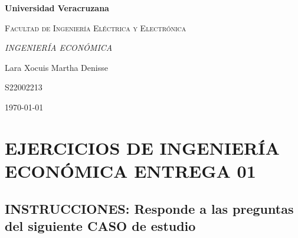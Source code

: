 \documentclass[letterpaper,12pt]{article}
\begin{document}
\thispagestyle{empty}
\newpage
\setcounter{page}{1}
\pagestyle{headings}
\begin{sloppypar} 
    \begin{titlepage}
        \hspace{2.5cm}
        {\bfseries\LARGE Universidad Veracruzana \par}
        \hspace{2cm}
        {\scshape\Large Facultad de Ingeniería Eléctrica y Electrónica \par}
        \begin{center}
            \vspace{7cm}
            {\itshape\huge INGENIERÍA ECONÓMICA \par}
            {\large Lara Xocuis Martha Denisse\par}
            {\large S22002213 \par}
            \vfill
            {\Large \today \par}
        \end{center}
    \end{titlepage} 

\section*{EJERCICIOS DE INGENIERÍA ECONÓMICA ENTREGA 01}
\subsection*{INSTRUCCIONES: Responde a las preguntas del siguiente CASO de estudio}

\end{sloppypar}
\end{document}
